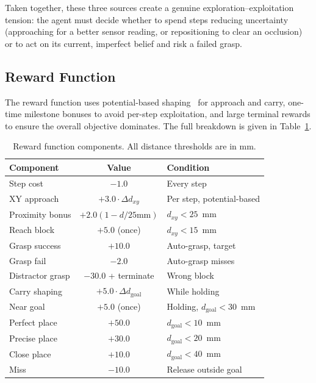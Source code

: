 \documentclass[conference]{IEEEtran}
\begin{document}
Taken together, these three sources create a genuine exploration--exploitation
tension: the agent must decide whether to spend steps reducing uncertainty
(approaching for a better sensor reading, or repositioning to clear an
occlusion) or to act on its current, imperfect belief and risk a failed grasp.

\subsection{Reward Function}

The reward function uses potential-based shaping~\cite{ng1999potential} for
approach and carry, one-time milestone bonuses to avoid per-step exploitation,
and large terminal rewards to ensure the overall objective dominates.
The full breakdown is given in Table~\ref{tab:reward}.

\begin{table}[!t]
  \caption{Reward function components. All distance thresholds are in mm.}
  \label{tab:reward}
  \centering
  \small
  \begin{tabular}{l c p{3.0cm}}
    \toprule
    Component & Value & Condition \\
    \midrule
    Step cost      & $-1.0$                  & Every step \\
    XY approach    & $+3.0 \!\cdot\! \Delta d_{xy}$ & Per step, potential-based \\
    Proximity bonus & $+2.0\!(1 - d/25\text{mm})$ & $d_{xy} < 25$~mm \\
    Reach block    & $+5.0$ (once)           & $d_{xy} < 15$~mm \\
    Grasp success  & $+10.0$                 & Auto-grasp, target \\
    Grasp fail     & $-2.0$                  & Auto-grasp misses \\
    Distractor grasp & $-30.0$ + terminate   & Wrong block \\
    Carry shaping  & $+5.0 \!\cdot\! \Delta d_{\text{goal}}$ & While holding \\
    Near goal      & $+5.0$ (once)           & Holding, $d_{\text{goal}} < 30$~mm \\
    Perfect place  & $+50.0$                 & $d_{\text{goal}} < 10$~mm \\
    Precise place  & $+30.0$                 & $d_{\text{goal}} < 20$~mm \\
    Close place    & $+10.0$                 & $d_{\text{goal}} < 40$~mm \\
    Miss           & $-10.0$                 & Release outside goal \\
    \bottomrule
  \end{tabular}
\end{table}
\end{document}
